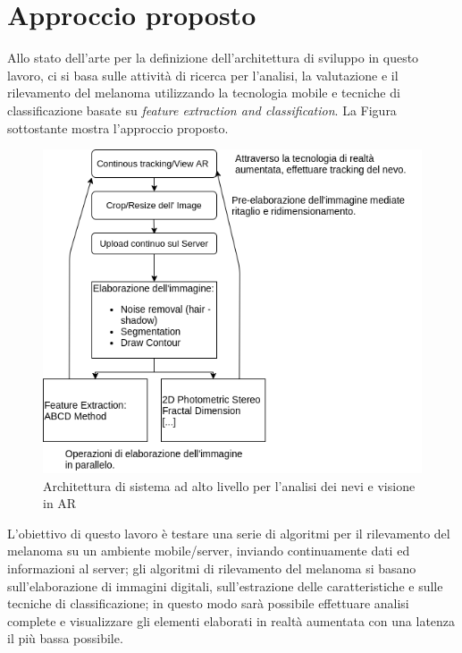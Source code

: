 {\section{Approccio proposto}
Allo stato dell'arte per la definizione dell'architettura di sviluppo in questo lavoro, ci si basa sulle attività di ricerca per l'analisi, la valutazione e il rilevamento del melanoma utilizzando la tecnologia mobile e tecniche di classificazione basate su \textit{feature extraction and classification}.\cite{mackinnon2016melanoma, taufiq2017m, chao2017smartphone, kleinjan2017introducing}
\newline
La Figura sottostante mostra l'approccio proposto.
\begin{figure}[h]
	\begin{center}
		\includegraphics[scale=0.75]{figure/capitolo4/architettura.png}
	\end{center}
	\caption{Architettura di sistema ad alto livello per l'analisi dei nevi e visione in AR}	
\end{figure}
\newline
L'obiettivo di questo lavoro è testare una serie di algoritmi per il rilevamento del melanoma su un ambiente mobile/server, inviando continuamente dati ed informazioni al server; gli algoritmi di rilevamento del melanoma si basano sull'elaborazione di immagini digitali, sull'estrazione delle caratteristiche e sulle tecniche di classificazione; in questo modo sarà possibile effettuare analisi complete e visualizzare gli elementi elaborati in realtà aumentata con una latenza il più bassa possibile.
}
